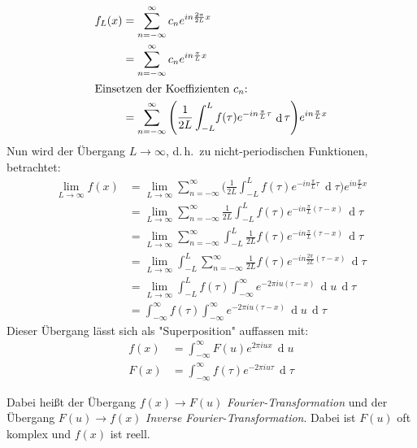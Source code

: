 \documentclass[a4paper, 11pt, accentcolor = tud3b]{tudreport}
\DeclareMathOperator{\total}{d}
\newcommand{\dif}[1]{\,\total#1}
\renewcommand{\dh}{d.\,h.~}
\begin{document}
			\begin{align*}
				f_L(x) &= \sum_{n = -\infty}^{\infty} c_n e^{in \frac{2\pi}{2L} x} \\
					 &= \sum_{n = -\infty}^{\infty} c_n e^{in \frac{\pi}{L} x} \\
				\intertext{Einsetzen der Koeffizienten \(c_n\):}
					&= \sum_{n = -\infty}^{\infty} \Bigg( \frac{1}{2L} \int_{-L}^{L} \! f(\tau) e^{-in \frac{\pi}{L} \tau} \dif{\tau} \Bigg) e^{in \frac{\pi}{L} x}
			\end{align*}
			Nun wird der Übergang \( L \to \infty \), \dh zu nicht-periodischen Funktionen, betrachtet:
			\begin{align*}
				\lim\limits_{L \to \infty} f(x)
					&= \lim\limits_{L \to \infty} \sum_{n = -\infty}^{\infty} \Bigg( \frac{1}{2L} \int_{-L}^{L} \! f(\tau) e^{-in \frac{\pi}{L} \tau} \dif{\tau} \Bigg) e^{in \frac{\pi}{L} x} \\
					&= \lim\limits_{L \to \infty} \sum_{n = -\infty}^{\infty} \frac{1}{2L} \int_{-L}^{L} \! f(\tau) e^{-in \frac{\pi}{L} (\tau - x)} \dif{\tau} \\
					&= \lim\limits_{L \to \infty} \sum_{n = -\infty}^{\infty} \int_{-L}^{L} \! \frac{1}{2L} f(\tau) e^{-in \frac{\pi}{L} (\tau - x)} \dif{\tau} \\
					&= \lim\limits_{L \to \infty} \int_{-L}^{L} \sum_{n = -\infty}^{\infty} \frac{1}{2L} f(\tau) e^{-in \frac{2\pi}{2L} (\tau - x)} \dif{\tau} \\
					&= \lim\limits_{L \to \infty} \int_{-L}^{L} \! f(\tau) \int_{-\infty}^{\infty} \! e^{-2\pi i u (\tau - x)} \dif{u} \dif{\tau} \\
					&= \int_{-\infty}^{\infty} \! f(\tau) \int_{-\infty}^{\infty} \! e^{-2\pi i u (\tau - x)} \dif{u} \dif{\tau}
			\end{align*}
			Dieser Übergang lässt sich als "Superposition" auffassen mit:
			\begin{align*}
				f(x) &= \int_{-\infty}^{\infty} \! F(u) e^{2\pi i u x} \dif{u} \\
				F(x) &= \int_{-\infty}^{\infty} \! f(\tau) e^{-2\pi i u \tau} \dif{\tau}
			\end{align*}
			
			Dabei heißt der Übergang \( f(x) \to F(u) \) \emph{Fourier-Transformation} und der Übergang \( F(u) \to f(x) \) \emph{Inverse Fourier-Transformation}. Dabei ist \(F(u)\) oft komplex und \(f(x)\) ist reell.
\end{document}
